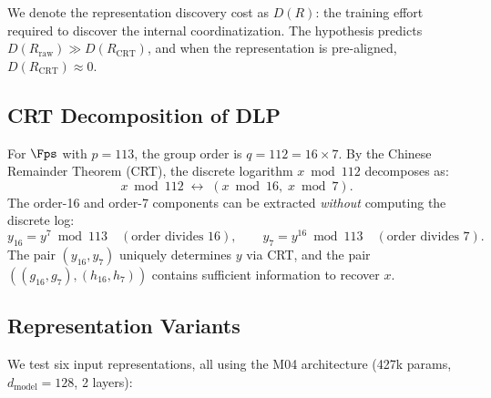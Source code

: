 We denote the representation discovery cost as $D(R)$: the training effort required to discover the internal coordinatization. The hypothesis predicts $D(R_{\mathrm{raw}}) \gg D(R_{\mathrm{CRT}})$, and when the representation is pre-aligned, $D(R_{\mathrm{CRT}}) \approx 0$.


\subsection{CRT Decomposition of DLP}
\label{sec:crt_setup}

For $\Fps$ with $p = 113$, the group order is $q = 112 = 16 \times 7$. By the Chinese Remainder Theorem (CRT), the discrete logarithm $x \bmod 112$ decomposes as:
\begin{equation}
    x \bmod 112 \;\longleftrightarrow\; (x \bmod 16,\; x \bmod 7).
\end{equation}
The order-16 and order-7 components can be extracted \emph{without} computing the discrete log:
\begin{equation}
    y_{16} = y^7 \bmod 113 \quad (\text{order divides 16}), \qquad
    y_7 = y^{16} \bmod 113 \quad (\text{order divides 7}).
\end{equation}
The pair $(y_{16}, y_7)$ uniquely determines $y$ via CRT, and the pair $((g_{16}, g_7), (h_{16}, h_7))$ contains sufficient information to recover $x$.


\subsection{Representation Variants}
\label{sec:crt_variants}

We test six input representations, all using the M04 architecture (427k params, $d_{\mathrm{model}}=128$, 2 layers):

